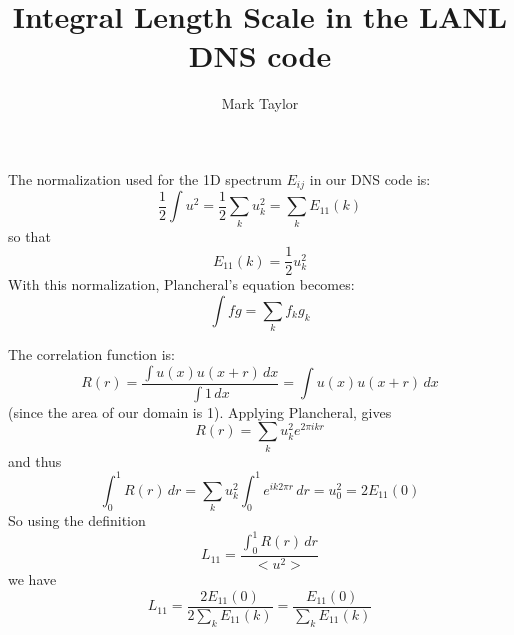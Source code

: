 \documentclass[12pt]{article}
\title{Integral Length Scale in the LANL DNS code}
\author{Mark Taylor}
\begin{document}

The normalization used for the 1D spectrum $E_{ij}$ in our DNS code
is:
\[
\frac12 \int u^2 = \frac12 \sum_k u_k^2  = \sum_k E_{11}(k)
\]
so that
\[
E_{11}(k) =  \frac12 u_k^2
\]
With this normalization, Plancheral's equation becomes:
\[
\int f g = \sum_k f_k g_k
\]

The correlation function is:
\[
R(r) = \frac{\int u(x) u(x+r) \,dx}{\int 1 \,dx   } = 
\int u(x) u(x+r) \,dx
\]
(since the area of our domain is 1).  Applying Plancheral,
gives
\[
R(r) =  \sum_k u_k^2  e^{2 \pi i k  r}
\]
and thus
\[
\int_0^1 R(r) \,dr = \sum_k u_k^2   \int_0^1 e^{i k 2 \pi r} \,dr
                   = u_0^2 = 2 E_{11}(0)
\]
So using the definition
\[
L_{11} = \frac{\int_0^1 R(r) \,dr}{< u^2 > }
\]
we have
\[
L_{11} =  \frac{ 2 E_{11}(0) }{ 2 \sum_k E_{11}(k) }
 = \frac{ E_{11}(0) }{ \sum_k E_{11}(k) }
\]
\end{document}
